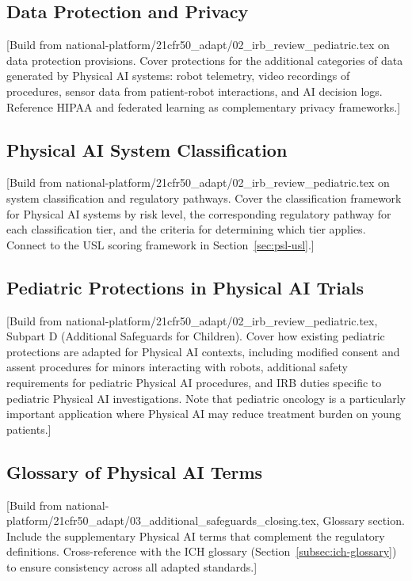 \subsection{Data Protection and Privacy}
\label{subsec:cfr50-data}

[Build from national-platform/21cfr50\_adapt/02\_irb\_review\_pediatric.tex on
data protection provisions. Cover protections for the additional categories of
data generated by Physical AI systems: robot telemetry, video recordings of
procedures, sensor data from patient-robot interactions, and AI decision logs.
Reference HIPAA \cite{hipaa} and federated learning \cite{fl-paper,
federated-learning-healthcare} as complementary privacy frameworks.]

\subsection{Physical AI System Classification}
\label{subsec:cfr50-classification}

[Build from national-platform/21cfr50\_adapt/02\_irb\_review\_pediatric.tex on
system classification and regulatory pathways. Cover the classification
framework for Physical AI systems by risk level, the corresponding regulatory
pathway for each classification tier, and the criteria for determining which
tier applies. Connect to the USL scoring framework in
Section~\ref{sec:psl-usl}.]

\subsection{Pediatric Protections in Physical AI Trials}
\label{subsec:cfr50-pediatric}

[Build from national-platform/21cfr50\_adapt/02\_irb\_review\_pediatric.tex,
Subpart D (Additional Safeguards for Children). Cover how existing pediatric
protections are adapted for Physical AI contexts, including modified consent
and assent procedures for minors interacting with robots, additional safety
requirements for pediatric Physical AI procedures, and IRB duties specific to
pediatric Physical AI investigations. Note that pediatric oncology is a
particularly important application where Physical AI may reduce treatment
burden on young patients.]

\subsection{Glossary of Physical AI Terms}
\label{subsec:cfr50-glossary}

[Build from national-platform/21cfr50\_adapt/03\_additional\_safeguards\_closing.tex,
Glossary section. Include the supplementary Physical AI terms that complement
the regulatory definitions. Cross-reference with the ICH glossary
(Section~\ref{subsec:ich-glossary}) to ensure consistency across all adapted
standards.]
